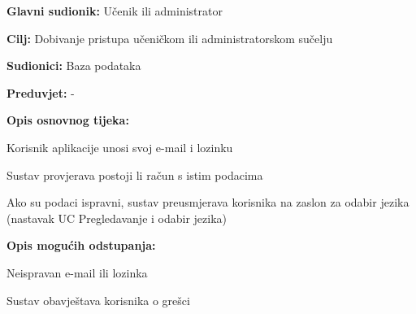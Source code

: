 \noindent {}
\begin{packed_item}

	\item \textbf{Glavni sudionik: } Učenik ili administrator
	\item \textbf{Cilj: } Dobivanje pristupa učeničkom ili administratorskom sučelju
	\item \textbf{Sudionici: } Baza podataka
	\item \textbf{Preduvjet: } -
	\item  \textbf{Opis osnovnog tijeka:}
	
	\item[] \begin{packed_enum}

		\item Korisnik aplikacije unosi svoj e-mail i lozinku
		\item Sustav provjerava postoji li račun s istim podacima
		\item Ako su podaci ispravni, sustav preusmjerava korisnika na zaslon za odabir jezika (nastavak UC Pregledavanje i odabir jezika)

	\end{packed_enum}
	
	\item  \textbf{Opis mogućih odstupanja:}
	
	\item[] \begin{packed_item}

		\item[2.a] Neispravan e-mail ili lozinka
		\item[] \begin{packed_enum}
			
			\item Sustav obavještava korisnika o grešci
			
		\end{packed_enum}
		
	\end{packed_item}
\end{packed_item}


